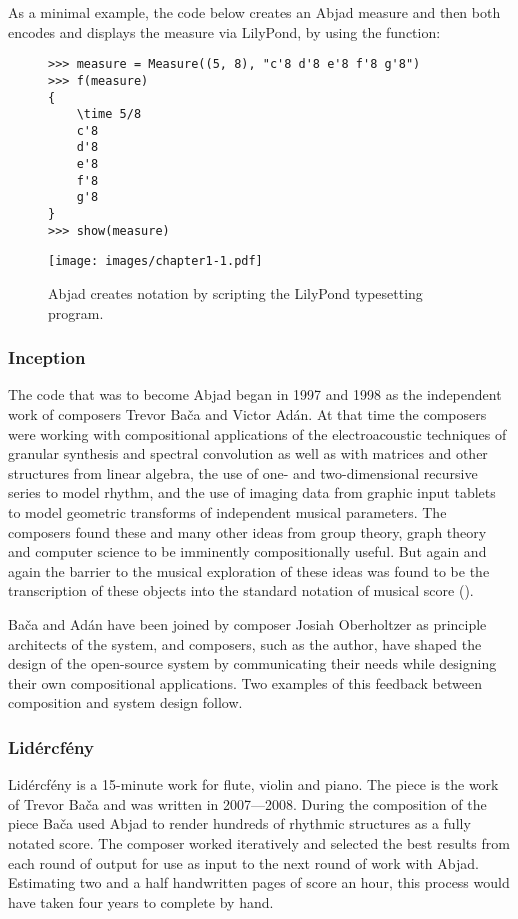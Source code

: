 As a minimal example, the code below creates an Abjad measure and then both encodes and displays the measure via LilyPond, by using the  function:

\begin{figure}[H] 
\begin{lstlisting}[basicstyle=\scriptsize\ttfamily, breaklines=True, tabsize=4, showtabs=false, showspaces=false]
>>> measure = Measure((5, 8), "c'8 d'8 e'8 f'8 g'8")
>>> f(measure)
{
    \time 5/8
    c'8
    d'8
    e'8
    f'8
    g'8
}
>>> show(measure)\end{lstlisting}

\texttt{[image: images/chapter1-1.pdf]}

  \caption{Abjad creates notation by scripting the LilyPond typesetting program. } 
\end{figure}

\subsubsection{Inception}
The code that was to become Abjad began in 1997 and 1998 as the independent work of composers Trevor Ba\v{c}a and Victor Ad\'{a}n. At that time the composers were working with compositional applications of the electroacoustic techniques of granular synthesis and spectral convolution as well as with matrices and other structures from linear algebra, the use of one- and two-dimensional recursive series to model rhythm, and the use of imaging data from graphic input tablets to model geometric transforms of independent musical parameters. The composers found these and many other ideas from group theory, graph theory and computer science to be imminently compositionally useful. But again and again the barrier to the musical exploration of these ideas was found to be the transcription of these objects into the standard notation of musical score (\cite{Baca:2010fk}). 

Ba\v{c}a and Ad\'{a}n have been joined by composer Josiah Oberholtzer as principle architects of the system, and composers, such as the author, have shaped the design of the open-source system by communicating their needs while designing their own compositional applications. Two examples of this feedback between composition and system design follow. 

\subsubsection{Lid\'{e}rcf\'{e}ny}
Lid\'{e}rcf\'{e}ny is a 15-minute work for flute, violin and piano. The piece is the work of Trevor Ba\v{c}a and was written in 2007---2008.
During the composition of the piece Ba\v{c}a used Abjad to render hundreds of rhythmic structures as a fully notated score. The composer worked iteratively and selected the best results from each round of output for use as input to the next round of work with Abjad. Estimating two and a half handwritten pages of score an hour, this process would have taken four years to complete by hand.

